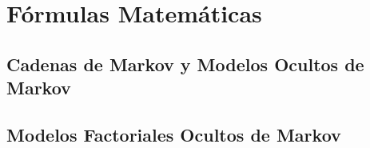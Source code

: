 \chapter{Fórmulas Matemáticas}
\label{ch:anexob}
\section{Cadenas de Markov y Modelos Ocultos de Markov}
\section{Modelos Factoriales Ocultos de Markov}
